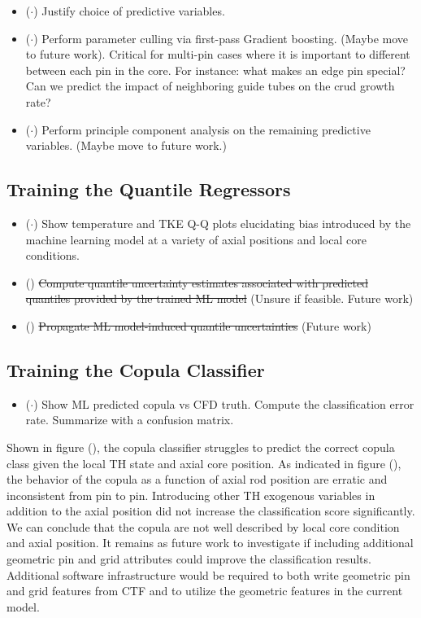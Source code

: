 \begin{itemize}
	\item ($\cdot$) Justify choice of predictive variables.
	\item ($\cdot$) Perform parameter culling via first-pass Gradient boosting. (Maybe move to future work). Critical for multi-pin cases where it is
	important to different between each pin in the core.  For instance: what makes an edge pin special?  Can we predict the impact of neighboring
	guide tubes on the crud growth rate?
	\item ($\cdot$) Perform principle component analysis on the remaining predictive variables. (Maybe move to future work.)
	
\end{itemize}

\subsection{Training the Quantile Regressors}

\begin{itemize}
	\item ($\cdot$) Show temperature and TKE Q-Q plots elucidating bias introduced by the machine learning model at a variety of axial positions and local core conditions.
	\item (\xmark) \sout{Compute quantile uncertainty estimates associated with predicted quantiles provided by the trained ML model} (Unsure if feasible. Future work)
	\item (\xmark) \sout{Propagate ML model-induced quantile uncertainties} (Future work)
\end{itemize}

\subsection{Training the Copula Classifier}

\begin{itemize}
	\item ($\cdot$)  Show ML predicted copula vs CFD truth.  Compute the classification error rate.
	Summarize with a confusion matrix.
\end{itemize}


Shown in figure (), the copula classifier struggles to predict the correct copula class given the local TH state and axial core position.  As indicated in figure (), the behavior of the copula as a function of axial rod position are erratic and inconsistent from pin to pin.  Introducing other TH exogenous variables in addition to the axial position did not increase the classification score significantly.  We can conclude that the copula are not well described by local core condition and axial position.  It remains as future work to investigate if including additional geometric pin and grid attributes could improve the classification results.  Additional software infrastructure would be required to both write geometric pin and grid features from CTF and to utilize the geometric features in the current model.

